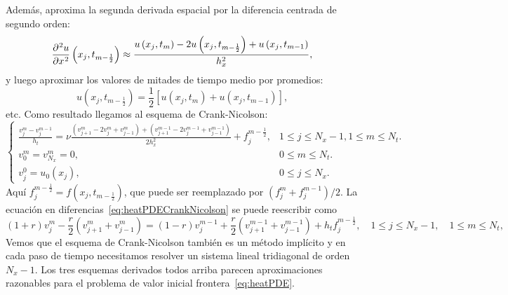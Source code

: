\begin{frame}
	\frametitle{\insertsection}

	Además, aproxima la segunda derivada espacial por la diferencia
	centrada de segundo orden:
	\begin{equation*}
		\diffp[2]{u}{x}
		\left(x_{j},t_{m-\frac{1}{2}}\right)\approx
		\frac{
			u\left(x_{j},t_{m}\right)-
			2u\left(x_{j},t_{m-\frac{1}{2}}\right)+
			u\left(x_{j},t_{m-1}\right)
		}{h^{2}_{x}},
	\end{equation*}
	y luego aproximar los valores de mitades de tiempo medio por
	promedios:
	\begin{equation*}
		u\left(x_{j},t_{m-\frac{1}{2}}\right)=
		\frac{1}{2}
		\left[
			u\left(x_{j},t_{m}\right)+
			u\left(x_{j},t_{m-1}\right)
			\right],
	\end{equation*}
	etc.
	Como resultado llegamos al esquema de Crank-Nicolson:
	\begin{equation}\label{eq:heatPDECrankNicolson}
		\begin{cases}\displaystyle
			\frac{v^{m}_{j}-v^{m-1}_{j}}{h_{t}}=
			\nu
			\frac{
				\left(v^{m}_{j+1}-2v^{m}_{j}+v^{m}_{j-1}\right)+
				\left(v^{m-1}_{j+1}-2v^{m-1}_{j}+v^{m-1}_{j-1}\right)
			}{2h^{2}_{x}}+
			f^{m-\frac{1}{2}}_{j},             &
			1\leq j\leq N_{x}-1, 1\leq m\leq N_{t}. \\
			v^{m}_{0}=v^{m}_{N_{x}}=0,         &
			0\leq m\leq N_{t}.                      \\
			v^{0}_{j}=u_{0}\left(x_{j}\right), &
			0\leq j\leq N_{x}.
		\end{cases}
	\end{equation}
	Aquí $f^{m-\frac{1}{2}}_{j}=f\left(x_{j},t_{m-\frac{1}{2}}\right)$,
	que puede ser reemplazado por $\left(f^{m}_{j}+f^{m-1}_{j}\right)/2$.
	La ecuación en diferencias~\eqref{eq:heatPDECrankNicolson} se puede
	reescribir como
	\begin{equation*}
		\left(1+r\right)v^{m}_{j}-
		\frac{r}{2}\left(v^{m}_{j+1}+v^{m}_{j-1}\right)=
		\left(1-r\right)v^{m-1}_{j}+
		\frac{r}{2}\left(v^{m-1}_{j+1}+v^{m-1}_{j-1}\right)+
		h_{t}f^{m-\frac{1}{2}}_{j},\quad
		1\leq j\leq N_{x}-1,\quad
		1\leq m\leq N_{t},
	\end{equation*}
	Vemos que el esquema de Crank-Nicolson también es un método
	implícito y en cada paso de tiempo necesitamos resolver un sistema
	lineal tridiagonal de orden $N_{x}-1$.
	Los tres esquemas derivados todos arriba parecen aproximaciones razonables
	para el problema de valor inicial frontera~\eqref{eq:heatPDE}.
\end{frame}

